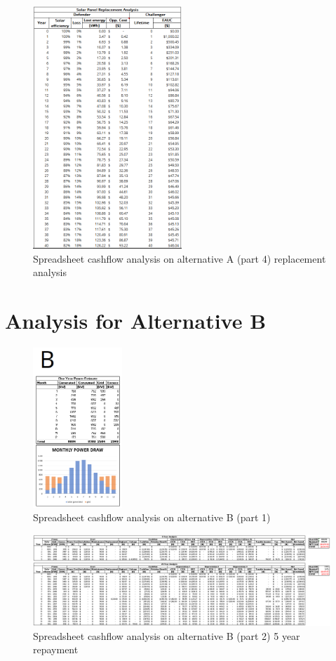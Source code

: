 \documentclass[10pt,letterpaper]{article}
\begin{document}
\begin{figure}[H]
	\centering
	\includegraphics[width=0.5\textwidth]{assets/1534569623916}
	\caption{Spreadsheet cashflow analysis on alternative A (part 4) replacement analysis}
\end{figure}

\clearpage
\section{Analysis for Alternative B}\label{appendix:b}
\begin{figure}[H]
	\centering
	\includegraphics[width=0.3\textwidth]{assets/1534569891414}
	\caption{Spreadsheet cashflow analysis on alternative B (part 1)}
\end{figure}

\begin{figure}[H]
	\centering
	\includegraphics[width=1.0\textwidth]{assets/1534570741142}
	\caption{Spreadsheet cashflow analysis on alternative B (part 2) 5 year repayment}
\end{figure}
\end{document}
